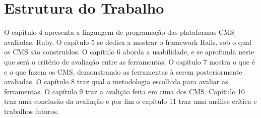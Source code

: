 \chapter{Estrutura do Trabalho}

O capítulo 4 apresenta a linguagem de programação das plataformas CMS avaliadas, Ruby. O capítulo 5 se dedica a mostrar o framework Rails, sob o qual os CMS são construídos. O capítulo 6 aborda a usabilidade, e se aprofunda neste que será o critério de avaliação entre as ferramentas. O capítulo 7 mostra o que é e o que fazem os CMS, demonstrando as ferramentas à serem posteriormente avaliadas. O capítulo 8 traz qual a metodologia escolhida para avaliar as ferramentas. O capítulo 9 traz a avalição feita em cima dos CMS. Capítulo 10 traz uma conclusão da avaliação e por fim o capítulo 11 traz uma análise crítica e trabalhos futuros.



